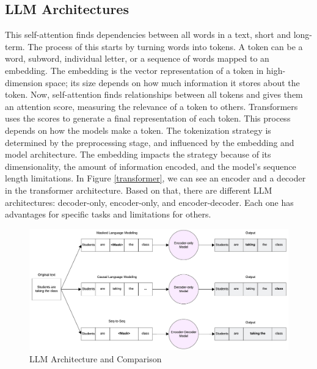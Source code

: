 \subsection{LLM Architectures}
This self-attention finds dependencies between all words in a text, short and long-term. The process of this starts by turning words into tokens. A token can be a word,
subword, individual letter, or a sequence of words mapped to an embedding. The embedding is the vector representation of a token in high-dimension space; its size
depends on how much information it stores about the token. Now, self-attention finds relationships between all tokens and gives them an attention score, measuring
the relevance of a token to others. Transformers uses the scores to generate a final representation of each token. This process depends on how the models make a token.
The tokenization strategy is determined by the preprocessing stage, and influenced by the embedding and model architecture. The embedding impacts the strategy
because of its dimensionality, the amount of information encoded, and the model's sequence length limitations. In Figure \ref{transformer},  we can see an encoder and a
decoder in the transformer architecture. Based on that, there are different LLM architectures: decoder-only, encoder-only, and encoder-decoder. Each one has advantages
for specific tasks and limitations for others.

\begin{figure}[!hb]
    \centering
        \includegraphics[width=1\linewidth]{images/LLM_Arch_text_generation.png}
        \caption{LLM Architecture and Comparison}
        \label{text_generation}
\end{figure}

